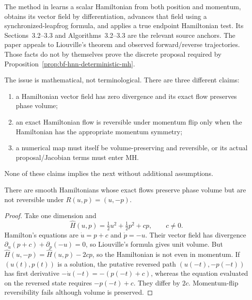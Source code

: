 The method in \citet{dhulipala2022latent} learns a scalar Hamiltonian from both
position and momentum, obtains its vector field by differentiation, advances
that field using a synchronized-leapfrog formula, and applies a true endpoint
Hamiltonian test.  Its Sections~3.2--3.3 and Algorithms~3.2--3.3 are the
relevant source anchors.  The paper appeals to Liouville's theorem and observed
forward/reverse trajectories.  Those facts do not by themselves prove the
discrete proposal required by Proposition~\ref{prop:bf-hnn-deterministic-mh}.

The issue is mathematical, not terminological.  There are three different
claims:
\begin{enumerate}
 \item a Hamiltonian vector field has zero divergence and its exact flow
 preserves phase volume;
 \item an exact Hamiltonian flow is reversible under momentum flip only when
 the Hamiltonian has the appropriate momentum symmetry;
 \item a numerical map must itself be volume-preserving and reversible, or its
 actual proposal/Jacobian terms must enter MH.
\end{enumerate}
None of these claims implies the next without additional assumptions.

\begin{proposition}
\label{prop:bf-hnn-liouville-not-reversibility}
There are smooth Hamiltonians whose exact flows preserve phase volume but are
not reversible under $R(u,p)=(u,-p)$.
\end{proposition}

\begin{proof}
Take one dimension and
\begin{equation}
 \widehat H(u,p)=\tfrac12u^2+\tfrac12p^2+cp,
 \qquad c\ne0.
\end{equation}
Hamilton's equations are $\dot u=p+c$ and $\dot p=-u$.  Their vector field has
divergence
$\partial_u(p+c)+\partial_p(-u)=0$, so Liouville's formula gives unit volume.
But $\widehat H(u,-p)=\widehat H(u,p)-2cp$, so the Hamiltonian is not even in
momentum.  If $(u(t),p(t))$ is a solution, the putative reversed path
$(u(-t),-p(-t))$ has first derivative
$-\dot u(-t)=-(p(-t)+c)$, whereas the equation evaluated on the reversed state
requires $-p(-t)+c$.  They differ by $2c$.  Momentum-flip reversibility fails
although volume is preserved.
\end{proof}

